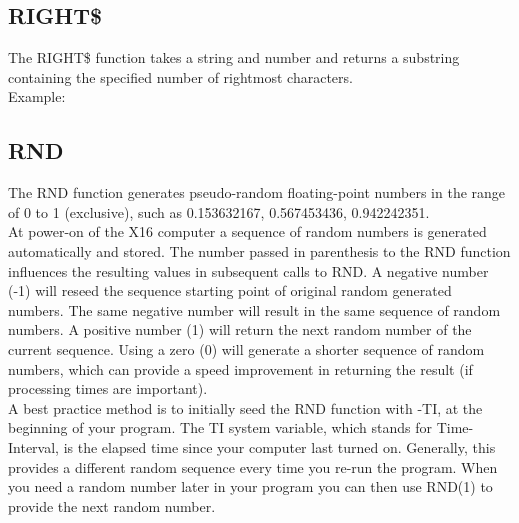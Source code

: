 
\subsection{RIGHT\$}

The {\ttfamily RIGHT\$} function takes a string and number and returns a
substring containing the specified number of rightmost characters.\\

Example:\\


\subsection{RND}

The {\ttfamily RND} function generates pseudo-random floating-point numbers in
the range of 0 to 1 (exclusive), such as 0.153632167, 0.567453436,
0.942242351.\\

At power-on of the X16 computer a sequence of random numbers is generated
automatically and stored.  The number passed in parenthesis to the {\ttfamily
RND} function influences the resulting values in subsequent calls to {\ttfamily
RND}.  A negative number (-1) will reseed the sequence starting point of
original random generated numbers.  The same negative number will result in the
same sequence of random numbers.  A positive number (1) will return the next
random number of the current sequence.  Using a zero (0) will generate a
shorter sequence of random numbers, which can provide a speed improvement in
returning the result (if processing times are important).\\

A best practice method is to initially seed the {\ttfamily RND} function with
{\ttfamily -TI}, at the beginning of your program.  The {\ttfamily TI} system
variable, which stands for Time-Interval, is the elapsed time since your
computer last turned on.  Generally, this provides a different random sequence
every time you re-run the program.  When you need a random number later in your
program you can then use RND(1) to provide the next random number.\\

